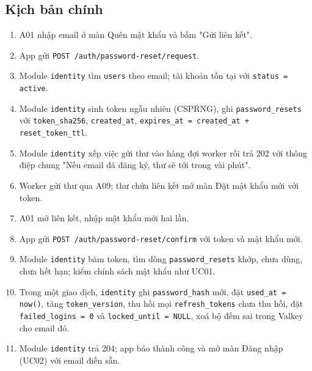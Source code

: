 \subsection{Kịch bản chính}
\begin{enumerate}
\item A01 nhập email ở màn Quên mật khẩu và bấm "Gửi liên kết".
\item App gửi {\small\texttt{POST /\allowbreak{}\allowbreak{}auth/\allowbreak{}\allowbreak{}password-\allowbreak{}reset/\allowbreak{}\allowbreak{}request}}.
\item Module {\small\texttt{identity}} tìm {\small\texttt{users}} theo email; tài khoản tồn tại với {\small\texttt{status = active}}.
\item Module {\small\texttt{identity}} sinh token ngẫu nhiên (CSPRNG), ghi {\small\texttt{password\_\allowbreak{}\allowbreak{}resets}} với {\small\texttt{token\_\allowbreak{}\allowbreak{}sha256}}, {\small\texttt{created\_\allowbreak{}\allowbreak{}at}}, {\small\texttt{expires\_\allowbreak{}\allowbreak{}at = created\_\allowbreak{}\allowbreak{}at + reset\_\allowbreak{}\allowbreak{}token\_\allowbreak{}\allowbreak{}ttl}}.
\item Module {\small\texttt{identity}} xếp việc gửi thư vào hàng đợi worker rồi trả 202 với thông điệp chung "Nếu email đã đăng ký, thư sẽ tới trong vài phút".
\item Worker gửi thư qua A09; thư chứa liên kết mở màn Đặt mật khẩu mới với token.
\item A01 mở liên kết, nhập mật khẩu mới hai lần.
\item App gửi {\small\texttt{POST /\allowbreak{}\allowbreak{}auth/\allowbreak{}\allowbreak{}password-\allowbreak{}reset/\allowbreak{}\allowbreak{}confirm}} với token và mật khẩu mới.
\item Module {\small\texttt{identity}} băm token, tìm dòng {\small\texttt{password\_\allowbreak{}\allowbreak{}resets}} khớp, chưa dùng, chưa hết hạn; kiểm chính sách mật khẩu như UC01.
\item Trong một giao dịch, {\small\texttt{identity}} ghi {\small\texttt{password\_\allowbreak{}\allowbreak{}hash}} mới, đặt {\small\texttt{used\_\allowbreak{}\allowbreak{}at = now()}}, tăng {\small\texttt{token\_\allowbreak{}\allowbreak{}version}}, thu hồi mọi {\small\texttt{refresh\_\allowbreak{}\allowbreak{}tokens}} chưa thu hồi, đặt {\small\texttt{failed\_\allowbreak{}\allowbreak{}logins = 0}} và {\small\texttt{locked\_\allowbreak{}\allowbreak{}until = NULL}}, xoá bộ đếm sai trong Valkey cho email đó.
\item Module {\small\texttt{identity}} trả 204; app báo thành công và mở màn Đăng nhập (UC02) với email điền sẵn.
\end{enumerate}
